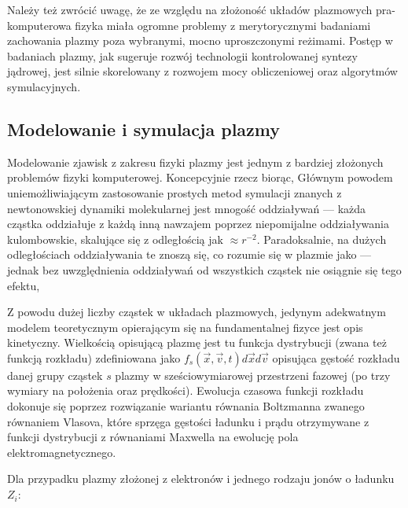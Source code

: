     Należy też zwrócić uwagę, że ze względu na złożoność układów plazmowych
    pra-komputerowa fizyka miała ogromne problemy z merytorycznymi badaniami
    zachowania plazmy poza wybranymi, mocno uproszczonymi reżimami. Postęp w
    badaniach plazmy, jak sugeruje rozwój technologii kontrolowanej syntezy
    jądrowej, jest silnie skorelowany z
    rozwojem mocy obliczeniowej oraz algorytmów symulacyjnych.\cite{youtube-plasma-algorithm-progress}

    \subsection{Modelowanie i symulacja plazmy}

    Modelowanie zjawisk z zakresu fizyki plazmy jest jednym z bardziej
    złożonych problemów fizyki komputerowej. Koncepcyjnie rzecz biorąc, Głównym
    powodem uniemożliwiającym zastosowanie prostych metod symulacji znanych z
    newtonowskiej dynamiki molekularnej jest mnogość oddziaływań --- każda cząstka
    oddziałuje z każdą inną nawzajem poprzez niepomijalne oddziaływania
    kulombowskie, skalujące się z odległością jak $\approx r^{-2}$. Paradoksalnie,
    na dużych odległościach oddziaływania te znoszą się, co rozumie się w plazmie
    jako  --- jednak bez uwzględnienia oddziaływań od
    wszystkich cząstek nie osiągnie się tego efektu,

    Z powodu dużej liczby cząstek w układach plazmowych, jedynym adekwatnym modelem teoretycznym
    opierającym się na fundamentalnej fizyce jest opis kinetyczny. Wielkością opisującą plazmę jest tu funkcja dystrybucji (zwana
    też funkcją rozkładu) zdefiniowana jako $f_s(\vec{x}, \vec{v}, t) d\vec{x}
    d\vec{v}$ opisująca gęstość rozkładu danej grupy cząstek $s$ plazmy w
    sześciowymiarowej przestrzeni fazowej (po trzy wymiary na położenia oraz
    prędkości). Ewolucja czasowa funkcji rozkładu dokonuje się poprzez
    rozwiązanie wariantu równania Boltzmanna zwanego równaniem Vlasova,
    które sprzęga gęstości ładunku i prądu otrzymywane z funkcji dystrybucji
    z równaniami Maxwella na ewolucję pola elektromagnetycznego.

    Dla przypadku plazmy złożonej z elektronów i jednego rodzaju jonów o ładunku $Z_i$:

